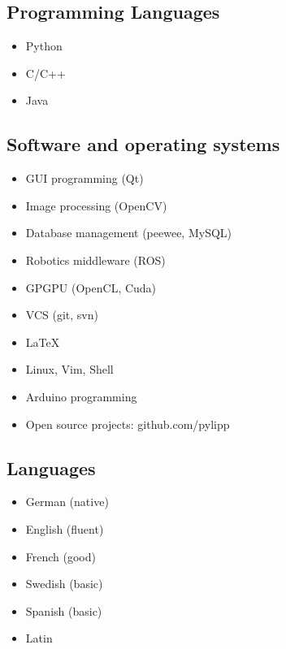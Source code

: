 \documentclass[a4paper,10pt]{memoir}
\begin{document}
\subsection*{Programming Languages}
\vspace*{-\baselineskip}
\begin{multicols}{3}
  \begin{itemize}
    \item Python
    \item C/C++
    \item Java
  \end{itemize}
\end{multicols}

\subsection*{Software and operating systems}
\vspace*{-\baselineskip}
\begin{multicols}{2}
\begin{itemize}
  \item GUI programming (Qt)
  \item Image processing (OpenCV)
  \item Database management (peewee, MySQL)
  \item Robotics middleware (ROS)
  \item GPGPU (OpenCL, Cuda)
  \item VCS (git, svn)
  \item \LaTeX
  \item Linux, Vim, Shell
  \item Arduino programming
  \item Open source projects: github.com/pylipp
\end{itemize}
\end{multicols}

\subsection*{Languages}
\vspace*{-\baselineskip}
\begin{multicols}{3}
  \begin{itemize}
    \item German (native)
    \item English (fluent)
    \item French (good)
    \item Swedish (basic)
    \item Spanish (basic)
    \item Latin
  \end{itemize}
\end{multicols}
\end{document}
